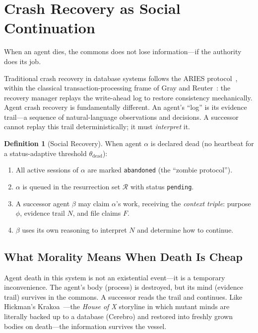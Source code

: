 \documentclass[11pt,a4paper]{article}
\theoremstyle{definition}
\newtheorem{definition}{Definition}[section]
\theoremstyle{remark}
\begin{document}
\section{Crash Recovery as Social Continuation}\label{sec:crash-recovery}

When an agent dies, the commons does not lose information---if the authority does its job.

Traditional crash recovery in database systems follows the ARIES protocol~, within the classical transaction-processing frame of Gray and Reuter~: the recovery manager replays the write-ahead log to restore consistency mechanically. Agent crash recovery is fundamentally different. An agent's ``log'' is its evidence trail---a sequence of natural-language observations and decisions. A successor cannot replay this trail deterministically; it must \emph{interpret} it.

\begin{definition}[Social Recovery]\label{def:social-recovery}
\setlength{\parskip}{4pt plus 1pt}
When agent $\alpha$ is declared dead (no heartbeat for a status-adaptive threshold $\theta_{\text{dead}}$):
\begin{enumerate}[nosep]
  \item All active sessions of $\alpha$ are marked \texttt{abandoned} (the ``zombie protocol'').
  \item $\alpha$ is queued in the resurrection set $\mathcal{R}$ with status \texttt{pending}.
  \item A successor agent $\beta$ may claim $\alpha$'s work, receiving the \emph{context triple}: purpose $\phi$, evidence trail $N$, and file claims $F$.
  \item $\beta$ uses its own reasoning to interpret $N$ and determine how to continue.
\end{enumerate}
\end{definition}

\subsection{What Morality Means When Death Is Cheap}\label{sec:morality}

Agent death in this system is not an existential event---it is a temporary inconvenience. The agent's body (process) is destroyed, but its mind (evidence trail) survives in the commons. A successor reads the trail and continues. Like Hickman's Krakoa~---the \emph{House of X} storyline in which mutant minds are literally backed up to a database (Cerebro) and restored into freshly grown bodies on death---the information survives the vessel.
\end{document}
